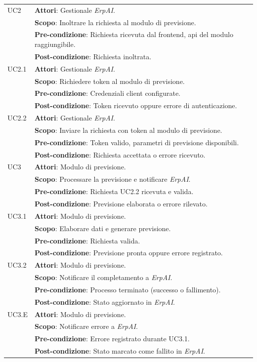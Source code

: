 {\begin{supertabular}{|p{2.75cm}|p{8cm}|}
    UC2 & \textbf{Attori}: Gestionale \textit{ErpAI}.\\
        & \textbf{Scopo}: Inoltrare la richiesta al modulo di previsione.\\
        & \textbf{Pre-condizione}: Richiesta ricevuta dal frontend, \gls{api} del modulo raggiungibile.\\
        & \textbf{Post-condizione}: Richiesta inoltrata. \\ \hline
    UC2.1 & \textbf{Attori}: Gestionale \textit{ErpAI}.\\
        & \textbf{Scopo}: Richiedere token al modulo di previsione.\\
        & \textbf{Pre-condizione}: Credenziali client configurate.\\
        & \textbf{Post-condizione}: Token ricevuto oppure errore di autenticazione. \\ \hline
    UC2.2 & \textbf{Attori}: Gestionale \textit{ErpAI}.\\
        & \textbf{Scopo}: Inviare la richiesta con token al modulo di previsione.\\
        & \textbf{Pre-condizione}: Token valido, parametri di previsione disponibili.\\
        & \textbf{Post-condizione}: Richiesta accettata o errore ricevuto. \\ \hline

    UC3 & \textbf{Attori}: Modulo di previsione.\\
        & \textbf{Scopo}: Processare la previsione e notificare \textit{ErpAI}.\\
        & \textbf{Pre-condizione}: Richiesta UC2.2 ricevuta e valida.\\
        & \textbf{Post-condizione}: Previsione elaborata o errore rilevato. \\ \hline
    UC3.1 & \textbf{Attori}: Modulo di previsione.\\
        & \textbf{Scopo}: Elaborare dati e generare previsione.\\
        & \textbf{Pre-condizione}: Richiesta valida.\\
        & \textbf{Post-condizione}: Previsione pronta oppure errore registrato. \\ \hline
    UC3.2 & \textbf{Attori}: Modulo di previsione.\\
        & \textbf{Scopo}: Notificare il completamento a \textit{ErpAI}.\\
        & \textbf{Pre-condizione}: Processo terminato (successo o fallimento).\\
        & \textbf{Post-condizione}: Stato aggiornato in \textit{ErpAI}. \\ \hline
    UC3.E & \textbf{Attori}: Modulo di previsione.\\
        & \textbf{Scopo}: Notificare errore a \textit{ErpAI}.\\
        & \textbf{Pre-condizione}: Errore registrato durante UC3.1.\\
        & \textbf{Post-condizione}: Stato marcato come fallito in \textit{ErpAI}. \\ \hline


\end{supertabular}}
